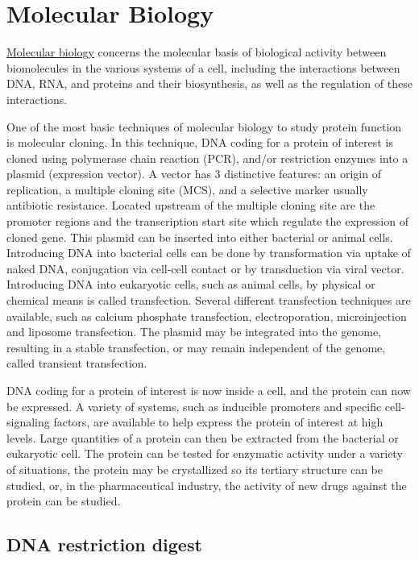 \chapter{Molecular Biology}\label{molecular-biology}

\href{https://en.wikipedia.org/wiki/Molecular_biology}{Molecular biology} concerns the molecular basis of biological activity between biomolecules in the various systems of a cell, including the interactions between DNA, RNA, and proteins and their biosynthesis, as well as the regulation of these interactions.

One of the most basic techniques of molecular biology to study protein function is molecular cloning. In this technique, DNA coding for a protein of interest is cloned using polymerase chain reaction (PCR), and/or restriction enzymes into a plasmid (expression vector). A vector has 3 distinctive features: an origin of replication, a multiple cloning site (MCS), and a selective marker usually antibiotic resistance. Located upstream of the multiple cloning site are the promoter regions and the transcription start site which regulate the expression of cloned gene. This plasmid can be inserted into either bacterial or animal cells. Introducing DNA into bacterial cells can be done by transformation via uptake of naked DNA, conjugation via cell-cell contact or by transduction via viral vector. Introducing DNA into eukaryotic cells, such as animal cells, by physical or chemical means is called transfection. Several different transfection techniques are available, such as calcium phosphate transfection, electroporation, microinjection and liposome transfection. The plasmid may be integrated into the genome, resulting in a stable transfection, or may remain independent of the genome, called transient transfection.

DNA coding for a protein of interest is now inside a cell, and the protein can now be expressed. A variety of systems, such as inducible promoters and specific cell-signaling factors, are available to help express the protein of interest at high levels. Large quantities of a protein can then be extracted from the bacterial or eukaryotic cell. The protein can be tested for enzymatic activity under a variety of situations, the protein may be crystallized so its tertiary structure can be studied, or, in the pharmaceutical industry, the activity of new drugs against the protein can be studied.

\section{DNA restriction digest}\label{dna-restriction-digest}

